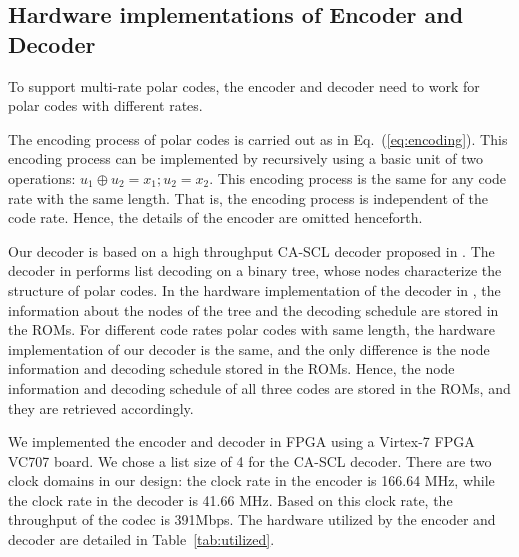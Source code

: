 \documentclass{article}
\begin{document}
\subsection{Hardware implementations of Encoder and Decoder}
To support multi-rate polar codes, the encoder and decoder need to work for polar codes with different rates.

The encoding process of polar codes is carried out as in Eq.~(\ref{eq:encoding}). This encoding process can be implemented by recursively using a basic unit of two operations: $u_1\oplus u_2 = x_1; u_2 = x_2$. This encoding process is the same for any code rate with the same length. That is, the encoding process is independent of the code rate. Hence, the details of the encoder are omitted henceforth.

Our decoder is based on a high throughput CA-SCL decoder proposed in \cite{reduced_latency_VLSI}. The decoder in \cite{reduced_latency_VLSI} performs list decoding on a binary tree, whose nodes characterize the structure of polar codes. In the hardware implementation of the decoder in \cite{reduced_latency_VLSI}, the information about the nodes of the tree 
and the decoding schedule are stored in the ROMs. For different code rates polar codes with same length, the hardware implementation of our decoder is the same, and the only difference is the node information and decoding schedule stored in the ROMs. Hence, the node information and decoding schedule of all three codes are stored in the ROMs, and they are retrieved accordingly. 

We implemented the encoder and decoder in FPGA using a Virtex-7 FPGA VC707 board. We chose a list size of 4 for the CA-SCL decoder. There are two clock domains in our design: the clock rate in the encoder is 166.64 MHz, while the clock rate in the decoder is 41.66 MHz. Based on this clock rate, the throughput of the codec is 391Mbps. The hardware utilized by the encoder and decoder are detailed in Table~\ref{tab:utilized}.
\end{document}
